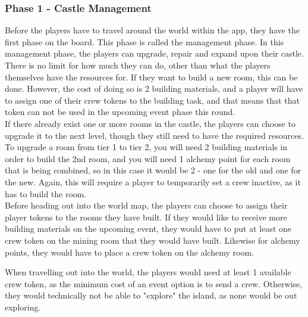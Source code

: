 \subsubsection{Phase 1 - Castle Management}
Before the players have to travel around the world within the app, they have the first phase on the board. This phase is called the management phase. 
In this management phase, the players can upgrade, repair and expand upon their castle.
There is no limit for how much they can do, other than what the players themselves have the resources for. If they want to build a new room, this can be done. However, the cost of doing so is 2 building materials, and a player will have to assign one of their crew tokens to the building task, and that means that that token can not be used in the upcoming event phase this round.\\
If there already exist one or more rooms in the castle, the players can choose to upgrade it to the next level, though they still need to have the required resources. To upgrade a room from tier 1 to tier 2, you will need 2 building materials in order to build the 2nd room, and you will need 1 alchemy point for each room that is being combined, so in this case it would be 2 - one for the old and one for the new. Again, this will require a player to temporarily set a crew inactive, as it has to build the room.\\

Before heading out into the world map, the players can choose to assign their player tokens to the rooms they have built. If they would like to receive more building materials on the upcoming event, they would have to put at least one crew token on the mining room that they would have built. Likewise for alchemy points, they would have to place a crew token on the alchemy room. 

When travelling out into the world, the players would need at least 1 available crew token, as the minimum cost of an event option is to send a crew. Otherwise, they would technically not be able to "explore" the island, as none would be out exploring.


